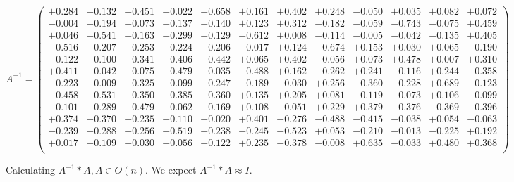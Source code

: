 \documentclass[9pt]{article}
\theoremstyle{plain}
\theoremstyle{definition}
\theoremstyle{remark}
\numberwithin{equation}{section}
\begin{document}
$A^{-1} = \left(
\begin{array}{
cccccccccccc}
+0.284 & +0.132 & -0.451 & -0.022 & -0.658 & +0.161 & +0.402 & +0.248 & -0.050 & +0.035 & +0.082 & +0.072 \\
-0.004 & +0.194 & +0.073 & +0.137 & +0.140 & +0.123 & +0.312 & -0.182 & -0.059 & -0.743 & -0.075 & +0.459 \\
+0.046 & -0.541 & -0.163 & -0.299 & -0.129 & -0.612 & +0.008 & -0.114 & -0.005 & -0.042 & -0.135 & +0.405 \\
-0.516 & +0.207 & -0.253 & -0.224 & -0.206 & -0.017 & +0.124 & -0.674 & +0.153 & +0.030 & +0.065 & -0.190 \\
-0.122 & -0.100 & -0.341 & +0.406 & +0.442 & +0.065 & +0.402 & -0.056 & +0.073 & +0.478 & +0.007 & +0.310 \\
+0.411 & +0.042 & +0.075 & +0.479 & -0.035 & -0.488 & +0.162 & -0.262 & +0.241 & -0.116 & +0.244 & -0.358 \\
-0.223 & -0.009 & -0.325 & -0.099 & +0.247 & -0.189 & -0.030 & +0.256 & -0.360 & -0.228 & +0.689 & -0.123 \\
-0.458 & -0.531 & +0.350 & +0.385 & -0.360 & +0.135 & +0.205 & +0.081 & -0.119 & -0.073 & +0.106 & -0.099 \\
-0.101 & -0.289 & -0.479 & +0.062 & +0.169 & +0.108 & -0.051 & +0.229 & +0.379 & -0.376 & -0.369 & -0.396 \\
+0.374 & -0.370 & -0.235 & +0.110 & +0.020 & +0.401 & -0.276 & -0.488 & -0.415 & -0.038 & +0.054 & -0.063 \\
-0.239 & +0.288 & -0.256 & +0.519 & -0.238 & -0.245 & -0.523 & +0.053 & -0.210 & -0.013 & -0.225 & +0.192 \\
+0.017 & -0.109 & -0.030 & +0.056 & -0.122 & +0.235 & -0.378 & -0.008 & +0.635 & -0.033 & +0.480 & +0.368 \\
\end{array}
\right)$ \newline 

Calculating $A^{-1} *A  ,  A \in O(n)$.   We expect $A^{-1} *A  \approx I$. 
\end{document}
